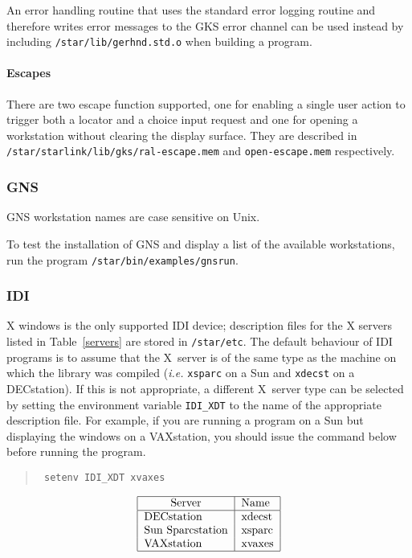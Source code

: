 An error handling routine that uses the standard error logging routine and
therefore writes error messages to the GKS error channel can be used instead by
including {\tt /star/lib/gerhnd.std.o} when building a program.

\paragraph{Escapes}
There are two escape function supported, one for enabling a single
user action to trigger
both a locator and a choice input request and one for opening a workstation
without clearing the display surface. They are described in {\tt
/star\-/starlink\-/lib\-/gks\-/ral-escape.mem} and {\tt open-escape.mem}
respectively.

\subsubsection{GNS}

GNS workstation names are case sensitive on Unix.

To test the installation of GNS and display a list of the available
workstations, run the program {\tt /star\-/bin\-/examples\-/gnsrun}.

\subsubsection{IDI}
X windows is the only supported IDI device; description files for the X servers
listed in Table~\ref{servers} are stored in {\tt/star\-/etc}. The default
behaviour of IDI programs is to assume that the X~server is of the same type as
the machine on which the library was compiled ({\it i.e.\/} {\tt xsparc} on
a Sun and {\tt xdecst}
on a DECstation). If this is not appropriate, a different X~server type can be
selected by setting the environment variable {\tt IDI\_XDT} to the name of the
appropriate description file. For example, if you are running a program on a
Sun but displaying the windows on a VAXstation, you should issue the
command below before running the program.
\begin{quote}\tt
setenv IDI\_XDT xvaxes
\end{quote}
\begin{table}\caption{IDI X server types}\label{servers}
\[\begin{tabular}{|l|l|}
\hline
\multicolumn{1}{|c|}{Server} &Name\\
\hline
DECstation       &xdecst \\
Sun Sparcstation &xsparc \\
VAXstation       &xvaxes \\
\hline
\end{tabular}\]
\end{table}


